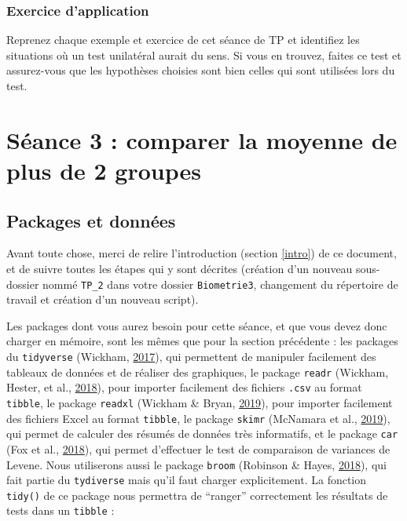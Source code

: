 \documentclass[a4paperpaper,]{article}
\begin{document}
\hypertarget{exercice-dapplication-3}{%
\subsubsection{Exercice d'application}\label{exercice-dapplication-3}}

Reprenez chaque exemple et exercice de cet séance de TP et identifiez les situations où un test unilatéral aurait du sens. Si vous en trouvez, faites ce test et assurez-vous que les hypothèses choisies sont bien celles qui sont utilisées lors du test.

\hypertarget{seance-3-comparer-la-moyenne-de-plus-de-2-groupes}{%
\section{Séance 3 : comparer la moyenne de plus de 2 groupes}\label{seance-3-comparer-la-moyenne-de-plus-de-2-groupes}}

\hypertarget{packages-et-donnees}{%
\subsection{Packages et données}\label{packages-et-donnees}}

Avant toute chose, merci de relire l'introduction (section \ref{intro}) de ce document, et de suivre toutes les étapes qui y sont décrites (création d'un nouveau sous-dossier nommé \texttt{TP\_2} dans votre dossier \texttt{Biometrie3}, changement du répertoire de travail et création d'un nouveau script).

Les packages dont vous aurez besoin pour cette séance, et que vous devez donc charger en mémoire, sont les mêmes que pour la section précédente : les packages du \texttt{tidyverse} (Wickham, \protect\hyperlink{ref-R-tidyverse}{2017}), qui permettent de manipuler facilement des tableaux de données et de réaliser des graphiques, le package \texttt{readr} (Wickham, Hester, et al., \protect\hyperlink{ref-R-readr}{2018}), pour importer facilement des fichiers \texttt{.csv} au format \texttt{tibble}, le package \texttt{readxl} (Wickham \& Bryan, \protect\hyperlink{ref-R-readxl}{2019}), pour importer facilement des fichiers Excel au format \texttt{tibble}, le package \texttt{skimr} (McNamara et al., \protect\hyperlink{ref-R-skimr}{2019}), qui permet de calculer des résumés de données très informatifs, et le package \texttt{car} (Fox et al., \protect\hyperlink{ref-R-car}{2018}), qui permet d'effectuer le test de comparaison de variances de Levene. Nous utiliserons aussi le package \texttt{broom} (Robinson \& Hayes, \protect\hyperlink{ref-R-broom}{2018}), qui fait partie du \texttt{tydiverse} mais qu'il faut charger explicitement. La fonction \texttt{tidy()} de ce package nous permettra de ``ranger'' correctement les résultats de tests dans un \texttt{tibble} :
\end{document}
